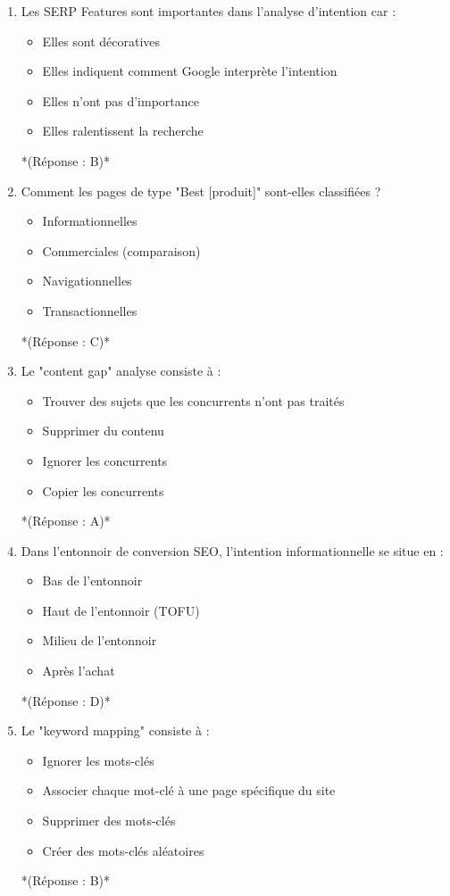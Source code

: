 \documentclass[12pt,a4paper,twoside]{report}
\begin{document}
\begin{enumerate}
\item Les SERP Features sont importantes dans l'analyse d'intention car :
\begin{itemize}
\item[A)] Elles sont décoratives
\item[B)] Elles indiquent comment Google interprète l'intention
\item[C)] Elles n'ont pas d'importance
\item[D)] Elles ralentissent la recherche
\end{itemize}
*(Réponse : B)*

\item Comment les pages de type "Best [produit]" sont-elles classifiées ?
\begin{itemize}
\item[A)] Informationnelles
\item[B)] Commerciales (comparaison)
\item[C)] Navigationnelles
\item[D)] Transactionnelles
\end{itemize}
*(Réponse : C)*

\item Le "content gap" analyse consiste à :
\begin{itemize}
\item[A)] Trouver des sujets que les concurrents n'ont pas traités
\item[B)] Supprimer du contenu
\item[C)] Ignorer les concurrents
\item[D)] Copier les concurrents
\end{itemize}
*(Réponse : A)*

\item Dans l'entonnoir de conversion SEO, l'intention informationnelle se situe en :
\begin{itemize}
\item[A)] Bas de l'entonnoir
\item[B)] Haut de l'entonnoir (TOFU)
\item[C)] Milieu de l'entonnoir
\item[D)] Après l'achat
\end{itemize}
*(Réponse : D)*

\item Le "keyword mapping" consiste à :
\begin{itemize}
\item[A)] Ignorer les mots-clés
\item[B)] Associer chaque mot-clé à une page spécifique du site
\item[C)] Supprimer des mots-clés
\item[D)] Créer des mots-clés aléatoires
\end{itemize}
*(Réponse : B)*


\end{enumerate}
\end{document}
